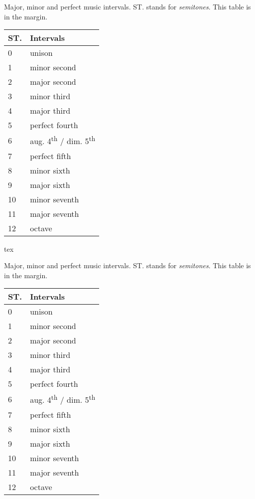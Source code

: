 \documentclass[
	raggedright,
	twoside,
	12pt,
	colorful,
]{tufte-style-article}
\begin{document}
\begin{margintable}[0pt]\small
\caption{Major, minor and perfect music intervals. ST. stands for \textit{semitones}. This table is in the margin. \label{tab:table-margin}}
\begin{tabular}{ll}
	\toprule
	\textbf{ST.} & \textbf{Intervals} \\
	\midrule
	0 & unison \\
	1 & minor second \\
	2 & major second \\
	3 & minor third \\
	4 & major third \\
	5 & perfect fourth \\
	6 & aug. 4\textsuperscript{th} / dim. 5\textsuperscript{th} \\
	7 & perfect fifth \\
	8 & minor sixth \\
	9 & major sixth \\
	10 & minor seventh \\
	11 & major seventh \\
	12 & octave \\
	\bottomrule
\end{tabular}
\end{margintable}

\begin{codebox}{tex}
\begin{margintable}[]\small
	\caption{Major, minor and perfect music intervals. ST. stands for \textit{semitones}. This table is in the margin. \label{tab:table-margin}}
	\begin{tabular}{ll}
		\toprule
		\textbf{ST.} & \textbf{Intervals} \\
		\midrule
		0 & unison \\
		1 & minor second \\
		2 & major second \\
		3 & minor third \\
		4 & major third \\
		5 & perfect fourth \\
		6 & aug. 4\textsuperscript{th} / dim. 5\textsuperscript{th} \\
		7 & perfect fifth \\
		8 & minor sixth \\
		9 & major sixth \\
		10 & minor seventh \\
		11 & major seventh \\
		12 & octave \\
		\bottomrule
	\end{tabular}
\end{margintable}
\end{codebox}
\end{document}

